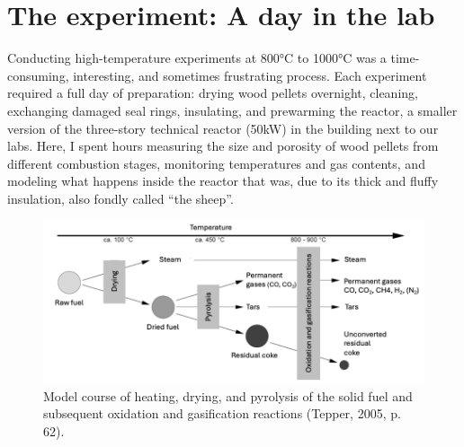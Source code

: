 \documentclass[authordate, anecdote]{jote-new-article}
\begin{document}
	\section{The experiment: A day in the lab}



	Conducting high-temperature experiments at 800°C to 1000°C was a time-consuming, interesting, and sometimes frustrating process. Each experiment required a full day of preparation: drying wood pellets overnight, cleaning, exchanging damaged seal rings, insulating, and prewarming the reactor, a smaller version of the three-story technical reactor (50kW) in the building next to our labs. Here, I spent hours measuring the size and porosity of wood pellets from different combustion stages, monitoring temperatures and gas contents, and modeling what happens inside the reactor that was, due to its thick and fluffy insulation, also fondly called “the sheep”.



	\begin{figure}
		\includegraphics[width=\linewidth]{media/image1.png}

		\caption{Model course of heating, drying, and pyrolysis of the solid fuel and subsequent oxidation and gasification reactions (Tepper, 2005, p. 62).}

		\label{fig:rId7}


	\end{figure}



	
\end{document}
